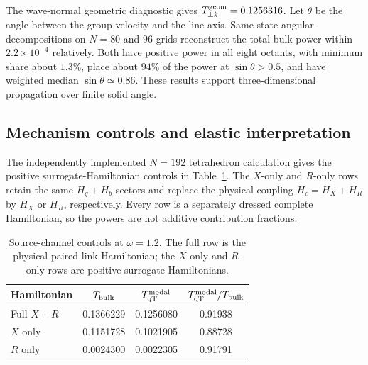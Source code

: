 \documentclass[10pt,aps,pre,reprint,floatfix,notitlepage,nofootinbib]{revtex4-2}
\newcommand{\qT}{\mathrm{qT}}
\begin{document}
The wave-normal geometric diagnostic gives $T_{\perp k}^{\rm geom}=0.1256316$. Let $\theta$ be the angle between the group velocity and the line axis. Same-state angular decompositions on $N=80$ and $96$ grids reconstruct the total bulk power within $2.2\times10^{-4}$ relatively. Both have positive power in all eight octants, with minimum share about $1.3\%$, place about $94\%$ of the power at $\sin\theta>0.5$, and have weighted median $\sin\theta\simeq0.86$. These results support three-dimensional propagation over finite solid angle.

\subsection{Mechanism controls and elastic interpretation}
\label{sec:s6-controls}

The independently implemented $N=192$ tetrahedron calculation gives the positive surrogate-Hamiltonian controls in Table~\ref{tab:s6-ablation}. The $X$-only and $R$-only rows retain the same $H_q+H_b$ sectors and replace the physical coupling $H_c=H_X+H_R$ by $H_X$ or $H_R$, respectively. Every row is a separately dressed complete Hamiltonian, so the powers are not additive contribution fractions.

\begin{table}[t]
 \squeezetable
 \caption{Source-channel controls at $\omega=1.2$.  The full row is the physical paired-link Hamiltonian; the $X$-only and $R$-only rows are positive surrogate Hamiltonians.}
 \label{tab:s6-ablation}
 \begin{ruledtabular}
 \begin{tabular}{lccc}
 Hamiltonian & $T_{\rm bulk}$ & $T_{\qT}^{\rm modal}$ & $T_{\qT}^{\rm modal}/T_{\rm bulk}$\\
 \hline
 Full $X+R$ & 0.1366229 & 0.1256080 & 0.91938\\
 $X$ only & 0.1151728 & 0.1021905 & 0.88728\\
 $R$ only & 0.0024300 & 0.0022305 & 0.91791\\
 \end{tabular}
 \end{ruledtabular}
\end{table}
\end{document}
